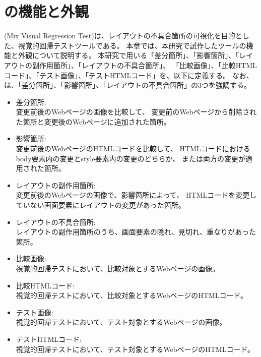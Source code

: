 \chapter{ \toolName の機能と外観}\label{cha:Function}
\toolName (Mix Visual Regression Test)は、レイアウトの不具合箇所の可視化を目的とした、視覚的回帰テストツールである。
本章では、本研究で試作したツール\toolName の機能と外観について説明する。
本研究で用いる「差分箇所」、「影響箇所」、「レイアウトの副作用箇所」、「レイアウトの不具合箇所」、
「比較画像」、「比較HTMLコード」、「テスト画像」、「テストHTMLコード」を、以下に定義する。
なお、\toolName は、「差分箇所」、「影響箇所」、「レイアウトの不具合箇所」の3つを強調する。
\begin{itemize}
    \item 差分箇所:\\
          変更前後のWebページの画像を比較して、
          変更前のWebページから削除された箇所と変更後のWebページに追加された箇所。
    \item 影響箇所:\\
          変更前後のWebページのHTMLコードを比較して、
          HTMLコードにおけるbody要素内の変更とstyle要素内の変更のどちらか、
          または両方の変更が適用された箇所。
    \item レイアウトの副作用箇所:\\
          変更前後のWebページの画像で、影響箇所によって、
          HTMLコードを変更していない画面要素にレイアウトの変更があった箇所。
    \item レイアウトの不具合箇所:\\
          レイアウトの副作用箇所のうち、画面要素の隠れ、見切れ、重なりがあった箇所。
    \item 比較画像:\\
          視覚的回帰テストにおいて、比較対象とするWebページの画像。
    \item 比較HTMLコード:\\
          視覚的回帰テストにおいて、比較対象とするWebページのHTMLコード。
    \item テスト画像:\\
          視覚的回帰テストにおいて、テスト対象とするWebページの画像。
    \item テストHTMLコード:\\
          視覚的回帰テストにおいて、テスト対象とするWebページのHTMLコード。


\end{itemize}
